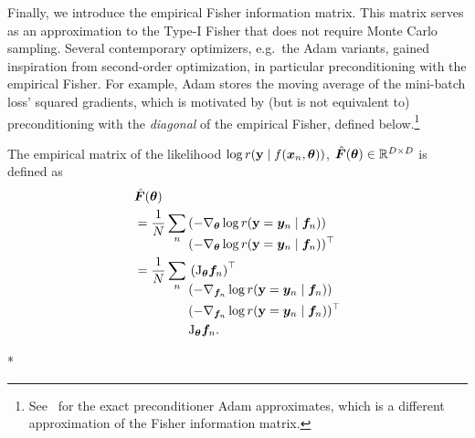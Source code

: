 Finally, we introduce the empirical Fisher information matrix.
This matrix serves as an approximation to the Type-I Fisher that does not require Monte Carlo sampling.
Several contemporary optimizers, e.g.~the Adam variants, gained inspiration from second-order optimization, in particular preconditioning with the empirical Fisher.
For example, Adam stores the moving average of the mini-batch loss' squared gradients, which is motivated by (but is not equivalent to) preconditioning with the \emph{diagonal} of the empirical Fisher, defined below.\footnote{See~\cite{lin2024can} for the exact preconditioner Adam approximates, which is a different approximation of the Fisher information matrix.}

\begin{definition}\label{def:emp_fisher}%
  The empirical matrix of the likelihood $\log r({\mathbf{y}} \mid f({\bm{x}}_n, {\bm{\theta}}))$,
  $\hat{{\bm{F}}}({\bm{\theta}}) \in {\mathbb{R}}^{D \times D}$ is defined as
  \begin{align*}
    & \hat{{\bm{F}}}({\bm{\theta}}) \\
	& = \frac{1}{N} \sum_{n}
	\begin{aligned}[t]
	   & (-\nabla_{{\bm{\theta}}} \log r({\mathbf{y}} = {\bm{y}}_n \mid {\bm{f}}_n))        \\
	   & (-\nabla_{{\bm{\theta}}} \log r({\mathbf{y}} = {\bm{y}}_n \mid {\bm{f}}_n))^{\top} \\
	\end{aligned} \\
    & = \frac{1}{N} \sum_{n}
    \begin{aligned}[t]
       & \left(\mathrm{J}_{{\bm{\theta}}}{\bm{f}}_n\right)^{\top}                  \\
       & (-\nabla_{{\bm{f}}_n} \log r({\mathbf{y}} = {\bm{y}}_n \mid {\bm{f}}_n))        \\
       & (-\nabla_{{\bm{f}}_n} \log r({\mathbf{y}} = {\bm{y}}_n \mid {\bm{f}}_n))^{\top} \\
       & \mathrm{J}_{{\bm{\theta}}}{\bm{f}}_n.
    \end{aligned}
  \end{align*}
\end{definition}

\switchcolumn[1]*
\switchcolumn[0]

